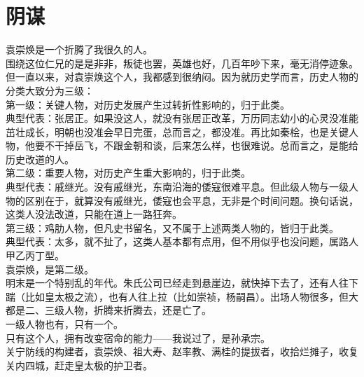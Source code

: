 \section{阴谋}
\ifnum{}
	\begin{multicols}{\theparacolNo}
\fi
袁崇焕是一个折腾了我很久的人。\\

围绕这位仁兄的是是非非，叛徒也罢，英雄也好，几百年吵下来，毫无消停迹象。\\

但一直以来，对袁崇焕这个人，我都感到很纳闷。因为就历史学而言，历史人物的分类大致分为三级：\\

第一级：关键人物，对历史发展产生过转折性影响的，归于此类。\\

典型代表：张居正。如果没这人，就没有张居正改革，万历同志幼小的心灵没准能茁壮成长，明朝也没准会早日完蛋，总而言之，都没准。再比如秦桧，也是关键人物，他要不干掉岳飞，不跟金朝和谈，后来怎么样，也很难说。总而言之，是能给历史改道的人。\\

第二级：重要人物，对历史产生重大影响的，归于此类。\\

典型代表：戚继光。没有戚继光，东南沿海的倭寇很难平息。但此级人物与一级人物的区别在于，就算没有戚继光，倭寇也会平息，无非是个时间问题。换句话说，这类人没法改道，只能在道上一路狂奔。\\

第三级：鸡肋人物，但凡史书留名，又不属于上述两类人物的，皆归于此类。\\

典型代表：太多，就不扯了，这类人基本都有点用，但不用似乎也没问题，属路人甲乙丙丁型。\\

袁崇焕，是第二级。\\

明末是一个特别乱的年代。朱氏公司已经走到悬崖边，就快掉下去了，还有人往下踹（比如皇太极之流），也有人往上拉（比如崇祯，杨嗣昌）。出场人物很多，但大都是二、三级人物，折腾来折腾去，还是亡了。\\

一级人物也有，只有一个。\\

只有这个人，拥有改变宿命的能力——我说过了，是孙承宗。\\

关宁防线的构建者，袁崇焕、祖大寿、赵率教、满桂的提拔者，收拾烂摊子，收复关内四城，赶走皇太极的护卫者。\\


\end{multicols}

